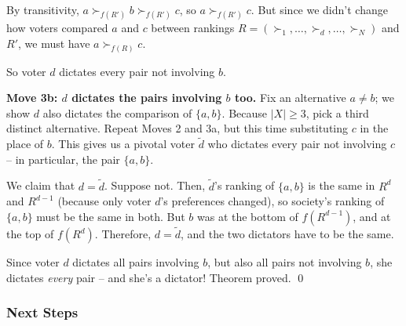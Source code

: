 \documentclass[12pt]{article}
\theoremstyle{definition}
\theoremstyle{remark}
\theoremstyle{plain}                          %
\begin{document}
By transitivity, $a \succ_{f(R')} b \succ_{f(R')} c$, so $a \succ_{f(R')} c$. But since we didn't change how voters compared $a$ and $c$ between rankings $R=(\succ_1,\dots,\succ_d,\dots,\succ_N)$ and $R'$, we must have $a \succ_{f(R)} c$.
 
So voter $d$ dictates every pair not involving $b$.
 
\medskip
\noindent\textbf{Move 3b: $d$ dictates the pairs involving $b$ too.}
Fix an alternative $a \ne b$; we show $d$ also dictates the comparison of $\{a,b\}$. Because $|X| \ge 3$, pick a third distinct alternative. Repeat Moves 2 and 3a, but this time substituting $c$ in the place of $b$. This gives us a pivotal voter $\tilde d$ who dictates every pair not involving $c$ -- in particular, the pair $\{a,b\}$.

We claim that $d=\tilde d$. Suppose not. Then, $\tilde d$'s ranking of $\{a,b\}$ is the same in $R^{d}$ and $R^{d-1}$ (because only voter $d$'s preferences changed), so society's ranking of $\{a,b\}$ must be the same in both. But $b$ was at the bottom of $f(R^{d-1})$, and at the top of $f(R^d)$. Therefore, $d = \tilde d$, and the two dictators have to be the same.

Since voter $d$ dictates all pairs involving $b$, but also all pairs not involving $b$, she dictates \textit{every} pair -- and she's a dictator! Theorem proved.
\qed
 
\subsubsection{Next Steps}
 
\end{document}
